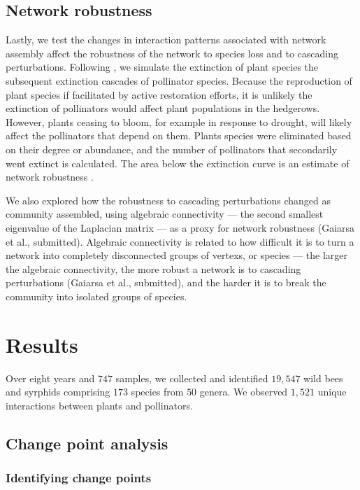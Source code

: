 \documentclass[12pt]{article}
\begin{document}
\subsection*{Network robustness}
Lastly, we test the changes in interaction patterns associated with
network assembly affect the robustness of the network to species loss
and to cascading perturbations. Following \cite{Memmott2004}, we
simulate the extinction of plant species the subsequent extinction
cascades of pollinator species. Because the reproduction of plant
species if facilitated by active restoration efforts, it is unlikely
the extinction of pollinators would affect plant populations in the
hedgerows. However, plants ceasing to bloom, for example in response
to drought, will likely affect the pollinators that depend on
them. Plants species were eliminated based on their degree or
abundance, and the number of pollinators that secondarily went extinct
is calculated. The area below the extinction curve is an estimate of
network robustness \citep{bipartite}.

We also explored how the robustness to cascading perturbations changed
as community assembled, using algebraic connectivity --- the second
smallest eigenvalue of the Laplacian matrix
\citep{fiedler1973algebraic} --- as a proxy for network robustness
(Gaiarsa et al., submitted). Algebraic connectivity is related to how
difficult it is to turn a network into completely disconnected groups
of vertexs, or species \citep{costa2007characterization} --- the larger
the algebraic connectivity, the more robust a network is to cascading
perturbations (Gaiarsa et al., submitted), and the harder it is to
break the community into isolated groups of species.

\section*{Results}
\label{sec:results}

Over eight years and $747$ samples, we collected and identified
$19,547$ wild bees and syrphids comprising $173$ species from $50$
genera. We observed $1,521$ unique interactions between plants and
pollinators.

\subsection*{Change point analysis}
\subsubsection*{Identifying change points}
\end{document}
